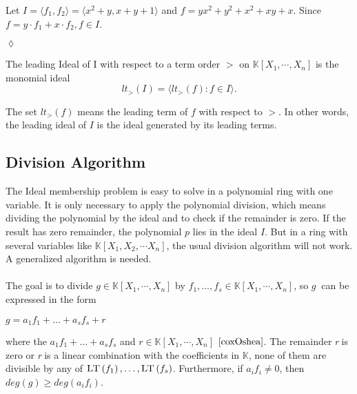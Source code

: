 \begin{env_example}\normalfont
Let $ I= \langle f_{1},f_{2} \rangle = \langle x^{2}+y, x+y+1 \rangle $ and $f=yx^{2}+y^{2}+x^{2}+xy+x$. Since $f= y \cdot f_{1} + x \cdot f_{2}, f\in I$.
\begin{flushright}
$\lozenge$
\end{flushright} 
\end{env_example}


\begin{env_definition}
\label{def:initial}
\cite{tigers} The leading Ideal of I with respect to a term order $>$ on $\mathbb{K}\left[X_{1}, \cdots, X_{n}\right]$ is the monomial ideal \\
\[lt_{>}(I) = \langle lt_{>}(f) : f \in I  \rangle . \]

\end{env_definition}
The set $lt_{>}(f)$ means the leading term of $f$ with respect to $>$. In other words, the leading ideal of $I$ is the ideal generated by its leading terms.

\newpage


\subsection{Division Algorithm}
\label{subsec:division}

The Ideal membership problem is easy to solve in a polynomial ring with one variable. It is only necessary to apply the polynomial division, which means dividing the polynomial by the ideal and to check if the remainder is zero. 
If the result has zero remainder, the polynomial $p$ lies in the ideal $I$.
But in a ring with several variables like $ \mathbb{K} \left[X_{1},X_{2},\cdots X_{n}\right]$, the usual division algorithm will not work. A generalized algorithm is needed.\\ \\
The goal is to divide $g \in \mathbb{K}\left[X_{1}, \cdots, X_{n}\right] $ by 
$f_{1}, \ldots, f_{s} \in \mathbb{K}\left[X_{1}, \cdots, X_{n}\right]$, so $g~$ can be expressed in the form \begin{center}
$g = a_{1}f_{1}+ \ldots + a_{s}f_{s} +r$
\end{center} 
where the $a_{1}f_{1}+ \ldots + a_{s}f_{s} $ and $r \in \mathbb{K}\left[X_{1}, \cdots, X_{n}\right]$ $\cite{coxOshea}$.
The remainder $r~$is zero or $r~$is a linear combination with the coefficients in $\mathbb{K}$, none of them are divisible by any of
$\textsc{LT}\left(f_{1} \right), \ldots, \textsc{LT}\left(f_{s} \right)  $.
Furthermore, if $a_{i}f_{i} \neq 0 $, then
$deg(g) \geq deg(a_{i}f_{i})$.

